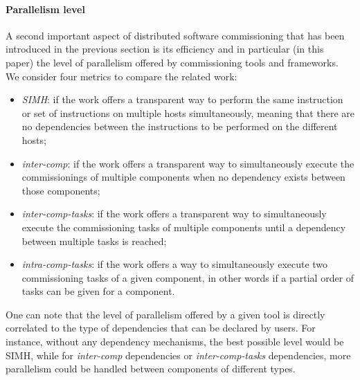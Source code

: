 \paragraph{Parallelism level}
A second important aspect of distributed software commissioning that
has been introduced in the previous section is its efficiency and in
particular (in this paper) the level of parallelism offered by
commissioning tools and frameworks. We consider four metrics to
compare the related work:
\begin{itemize}
\item \emph{SIMH}: if the work offers a transparent way to perform the
  same instruction or set of instructions on multiple hosts
  simultaneously, meaning that there are no dependencies between the
  instructions to be performed on the different hosts;
  \item \emph{inter-comp}: if the work offers a transparent way to
    simultaneously execute the commissionings of multiple components
    when no dependency exists between those components;
  \item \emph{inter-comp-tasks}: if the work offers a transparent way to
    simultaneously execute the commissioning tasks of multiple
    components until a dependency between multiple tasks is reached;
  \item \emph{intra-comp-tasks}: if the work offers a way to simultaneously
    execute two commissioning tasks of a given component, in other
    words if a partial order of tasks can be given for a component.
\end{itemize}
One can note that the level of parallelism offered by a given tool is
directly correlated to the type of dependencies that can be declared
by users. For instance, without any dependency mechanisms, the best
possible level would be SIMH, while for \emph{inter-comp} dependencies
or \emph{inter-comp-tasks} dependencies, more parallelism could be
handled between components of different types.

